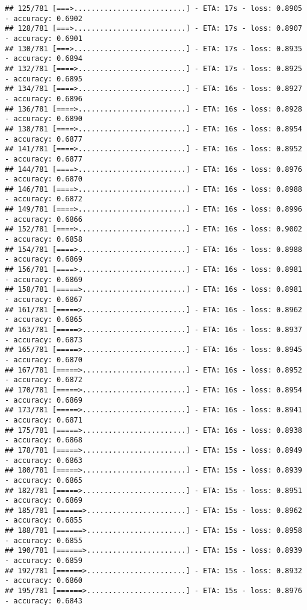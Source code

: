 \documentclass[
]{article}
\begin{document}
\begin{verbatim}
## 125/781 [===>..........................] - ETA: 17s - loss: 0.8905 - accuracy: 0.6902
## 128/781 [===>..........................] - ETA: 17s - loss: 0.8907 - accuracy: 0.6901
## 130/781 [===>..........................] - ETA: 17s - loss: 0.8935 - accuracy: 0.6894
## 132/781 [====>.........................] - ETA: 17s - loss: 0.8925 - accuracy: 0.6895
## 134/781 [====>.........................] - ETA: 16s - loss: 0.8927 - accuracy: 0.6896
## 136/781 [====>.........................] - ETA: 16s - loss: 0.8928 - accuracy: 0.6890
## 138/781 [====>.........................] - ETA: 16s - loss: 0.8954 - accuracy: 0.6877
## 141/781 [====>.........................] - ETA: 16s - loss: 0.8952 - accuracy: 0.6877
## 144/781 [====>.........................] - ETA: 16s - loss: 0.8976 - accuracy: 0.6870
## 146/781 [====>.........................] - ETA: 16s - loss: 0.8988 - accuracy: 0.6872
## 149/781 [====>.........................] - ETA: 16s - loss: 0.8996 - accuracy: 0.6866
## 152/781 [====>.........................] - ETA: 16s - loss: 0.9002 - accuracy: 0.6858
## 154/781 [====>.........................] - ETA: 16s - loss: 0.8988 - accuracy: 0.6869
## 156/781 [====>.........................] - ETA: 16s - loss: 0.8981 - accuracy: 0.6869
## 158/781 [=====>........................] - ETA: 16s - loss: 0.8981 - accuracy: 0.6867
## 161/781 [=====>........................] - ETA: 16s - loss: 0.8962 - accuracy: 0.6865
## 163/781 [=====>........................] - ETA: 16s - loss: 0.8937 - accuracy: 0.6873
## 165/781 [=====>........................] - ETA: 16s - loss: 0.8945 - accuracy: 0.6870
## 167/781 [=====>........................] - ETA: 16s - loss: 0.8952 - accuracy: 0.6872
## 170/781 [=====>........................] - ETA: 16s - loss: 0.8954 - accuracy: 0.6869
## 173/781 [=====>........................] - ETA: 16s - loss: 0.8941 - accuracy: 0.6871
## 175/781 [=====>........................] - ETA: 16s - loss: 0.8938 - accuracy: 0.6868
## 178/781 [=====>........................] - ETA: 15s - loss: 0.8949 - accuracy: 0.6863
## 180/781 [=====>........................] - ETA: 15s - loss: 0.8939 - accuracy: 0.6865
## 182/781 [=====>........................] - ETA: 15s - loss: 0.8951 - accuracy: 0.6869
## 185/781 [======>.......................] - ETA: 15s - loss: 0.8962 - accuracy: 0.6855
## 188/781 [======>.......................] - ETA: 15s - loss: 0.8958 - accuracy: 0.6855
## 190/781 [======>.......................] - ETA: 15s - loss: 0.8939 - accuracy: 0.6859
## 192/781 [======>.......................] - ETA: 15s - loss: 0.8932 - accuracy: 0.6860
## 195/781 [======>.......................] - ETA: 15s - loss: 0.8976 - accuracy: 0.6843

\end{verbatim}
\end{document}

